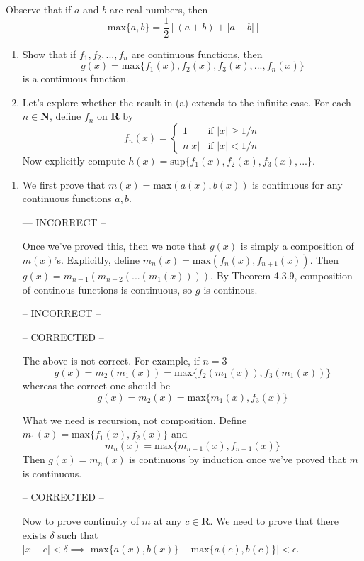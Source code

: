 \documentclass{oxmathproblems}
\begin{document}
\begin{questions}
\miquestion Observe that if $a$ and $b$ are real numbers, then
\[\text{max}\{a, b\} = \frac{1}{2}[(a+b) + |a-b|]\]
\begin{enumerate}[label=(\alph*)]
  \item Show that if $f_{1}, f_{2}, ..., f_{n}$ are continuous functions, then
  \[g(x) = \text{max}\{f_{1}(x), f_{2}(x), f_{3}(x), ..., f_{n}(x)\}\]
  is a continuous function.
  \item Let's explore whether the result in (a) extends to the infinite case. For each $n \in \textbf{N}$, define $f_{n}$ on $\textbf{R}$ by
  \[
    f_{n}(x) = \begin{cases} 
    1 & \text{if } |x| \geq 1/n \\
    n|x| & \text{if } |x| < 1/n
    \end{cases}
  \]
  Now explicitly compute $h(x) = \text{sup}\{f_{1}(x), f_{2}(x), f_{3}(x), ...\}$.
\end{enumerate}

\begin{solution}
  \begin{enumerate}[label=(\alph*)]
    \item We first prove that $m(x) = \text{max}(a(x),b(x))$ is continuous for any continuous functions $a, b$. 
    
    --- INCORRECT --

    Once we've proved this, then we note that $g(x)$ is simply a composition of $m(x)$'s. Explicitly, define $m_{n}(x)=\text{max}(f_{n}(x), f_{n+1}(x))$. Then $g(x)=m_{n-1}(m_{n-2}(...(m_{1}(x))))$.
    By Theorem 4.3.9, composition of continous functions is continuous, so $g$ is continous.

    -- INCORRECT --

    -- CORRECTED -- 
  
    The above is not correct. For example, if $n=3$
    \[g(x) = m_{2}(m_{1}(x)) = \text{max}\{f_{2}(m_{1}(x)), f_{3}(m_{1}(x))\}\]
    whereas the correct one should be
    \[g(x) = m_{2}(x)=\text{max}\{m_{1}(x), f_{3}(x)\}\]

    What we need is recursion, not composition. Define $m_{1}(x)=\text{max}\{f_{1}(x), f_{2}(x)\}$ and
    \[m_{n}(x) = \text{max}\{m_{n-1}(x), f_{n+1}(x)\}\]
    Then $g(x)=m_{n}(x)$ is continuous by induction once we've proved that $m$ is continuous.

    -- CORRECTED -- 

    Now to prove continuity of $m$ at any $c \in \textbf{R}$. We need to prove that there exists $\delta$ such that $|x-c| < \delta \implies |\text{max}\{a(x), b(x)\} - \text{max}\{a(c), b(c)\}| < \epsilon$.
    

\end{enumerate}
\end{solution}
\end{questions}
\end{document}
